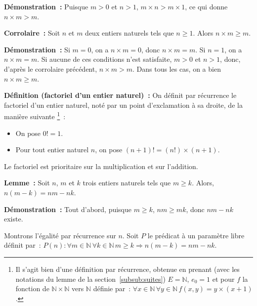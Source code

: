 \medskip

\noindent\textbf{Démonstration :} Puisque $m > 0$ et $n > 1$, $m \times n > m \times 1$, ce qui donne $n \times m > m$.

   \done 

\medskip

\noindent\textbf{Corrolaire :} Soit $n$ et $m$ deux entiers naturels tels que $n \geq 1$. 
    Alors $n \times m \geq m$.

\medskip

\noindent\textbf{Démonstration :} 
    Si $m = 0$, on a $n \times m = 0$, donc $n \times m = m$.
    Si $n = 1$, on a $n \times m = m$.
    Si aucune de ces conditions n'est satisfaite, $m > 0$ et $n > 1$, donc, d'après le corrolaire précédent, $n \times m > m$.
    Dans tous les cas, on a bien $n \times m \geq m$.

   \done 

\medskip

\noindent\textbf{Définition (factoriel d'un entier naturel) :} On définit par récurrence le factoriel d'un entier naturel, noté par un point d'exclamation à sa droite, de la manière suivante%
\footnote{
    Il s'agit bien d'une définition par récurrence, obtenue en prenant (avec les notations du lemme de la section~\ref{subsub:suites}) $E = \mathbb{N}$, $e_0 = 1$ et pour $f$ la fonction de $\mathbb{N} \times \mathbb{N}$ vers $\mathbb{N}$ définie par : $\forall x \in \mathbb{N} \, \forall y \in \mathbb{N} \, f(x,y) = y \times (x+1)$.
}~:
\begin{itemize}[nosep]
    \item On pose $0! = 1$.
    \item Pour tout entier naturel $n$, on pose $(n+1)! = (n!) \times (n+1)$.
\end{itemize}
Le factoriel est prioritaire sur la multiplication et sur l'addition. 

\medskip

\noindent\textbf{Lemme :} Soit $n$, $m$ et $k$ trois entiers naturels tels que $m \geq k$.
    Alors, $n (m - k) = n m - n k$.

\medskip

\noindent\textbf{Démonstration :} 
    Tout d'abord, puisque $m \geq k$, $n m \geq m k$, donc $n m - n k$ existe.

    Montrons l'égalité par récurrence sur $n$. 
    Soit $P$ le prédicat à un paramètre libre définit par : $P(n): \forall m \in \mathbb{N} \, \forall k \in \mathbb{N} \, m \geq k \Rightarrow n (m-k) = n m - n k$. 
    

